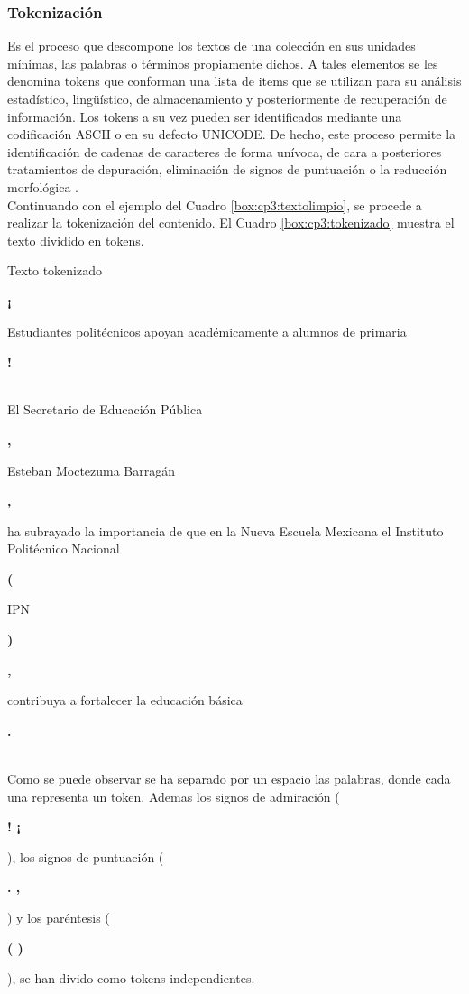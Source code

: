 \subsubsection{Tokenización}

Es el proceso que descompone los textos de una colección en sus unidades mínimas, las palabras
o términos propiamente dichos. A tales elementos se les denomina tokens que conforman una lista de
items que se utilizan para su análisis estadístico, ling{\"u}ístico, de almacenamiento y posteriormente de
recuperación de información. Los tokens a su vez pueden ser identificados mediante una codificación
ASCII o en su defecto UNICODE. De hecho, este proceso permite la identificación de cadenas de caracteres de
forma unívoca, de cara a posteriores tratamientos de depuración, eliminación de signos de puntuación
o la reducción morfológica \citep{CT12}.\\

Continuando con el ejemplo del Cuadro \ref{box:cp3:textolimpio}, se procede a realizar la tokenización del contenido. El Cuadro \ref{box:cp3:tokenizado} muestra el texto dividido en tokens.\\

\begin{mygraybox}[label={box:cp3:tokenizado}]{Texto tokenizado} 
\begin{large}\textbf{¡}\end{large} Estudiantes politécnicos apoyan académicamente a alumnos de primaria \begin{large}\textbf{!}\end{large}\\

El Secretario de Educación Pública \begin{Large}\textbf{,}\end{Large} Esteban Moctezuma Barragán \begin{Large}\textbf{,}\end{Large} ha subrayado la importancia  de que en la Nueva Escuela Mexicana el Instituto Politécnico Nacional \begin{Large}\textbf{(}\end{Large} IPN \begin{Large}\textbf{)}\end{Large} \begin{Large}\textbf{,}\end{Large} contribuya a fortalecer la educación básica \begin{Large}\textbf{.}\end{Large}
\end{mygraybox}
\ \\
Como se puede observar se ha separado por un espacio las palabras, donde cada una representa un token. Ademas los signos de admiración (\begin{large}\textbf{! ¡}\end{large}), los signos de puntuación (\begin{large}\textbf{. ,}\end{large}) y los paréntesis (\begin{large}\textbf{( )}\end{large}), se han divido como tokens independientes.

